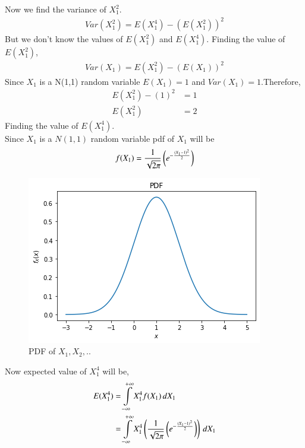 \documentclass[journal,12pt,twocolumn]{IEEEtran}
\begin{document}
Now we find the variance of $X_{1}^2$.
\begin{align}
    Var(X_{1}^2)=E(X_{1}^4)-(E(X_{1}^2))^2
\end{align}
But we don't know the values of $E(X_{1}^2)$ and $E(X_{1}^4)$.
Finding the value of $E(X_{1}^2)$,
\begin{align}
    Var(X_{1})=E(X_{1}^2)-(E(X_{1}))^2
\end{align}
Since $X_{1}$ is a N(1,1) random variable $E(X_{1})=1$ and $Var(X_{1})=1$.Therefore,
\begin{align}
    E(X_{1}^2)-(1)^2&=1
 \\  E(X_{1}^2)&=2
\end{align}
Finding the value of $E(X_{1}^4)$.
\\Since $X_{1}$ is a $N(1,1)$ random variable pdf of $X_{1}$ will be 
\begin{align}
    f(X_{1})=\frac{1}{\sqrt{2\pi}}\left(e^{-\frac{(X_{1}-1)^2}{2}}\right)
\end{align}
\begin{figure}[h]
    \centering
    \includegraphics[width=\columnwidth]{PDF.png}
    \caption{PDF of $X_{1},X_{2},..$}
    \label{fig:my_label}
\end{figure}

Now expected value of $X_{1}^{4}$ will be,
\begin{align}
   E(X_{1}^4)&=\int\limits_{-\infty}^{+\infty}X_{1}^{4}f(X_{1})\,dX_{1}
\\   &=\int\limits_{-\infty}^{+\infty}X_{1}^{4}\left(\frac{1}{\sqrt{2\pi}}\left(e^{-\frac{(X_{1}-1)^2}{2}}\right)\right)\,dX_{1}
\end{align}
\end{document}
